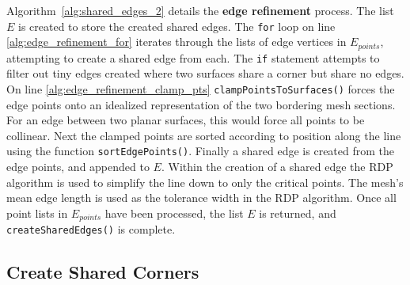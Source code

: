 Algorithm~\ref{alg:shared_edges_2} details the \textbf{edge refinement} process.
The list $E$ is created to store the created shared edges.
The \verb|for| loop on line \ref{alg:edge_refinement_for} iterates through the lists of edge vertices in $E_{points}$, attempting to create a shared edge from each.
The \verb|if| statement attempts to filter out tiny edges created where two surfaces share a corner but share no edges.
On line \ref{alg:edge_refinement_clamp_pts} \verb|clampPointsToSurfaces()| forces the edge points onto an idealized representation of the two bordering mesh sections.
For an edge between two planar surfaces, this would force all points to be collinear.
Next the clamped points are sorted according to position along the line using the function \verb|sortEdgePoints()|.
Finally a shared edge is created from the edge points, and appended to $E$.
Within the creation of a shared edge the RDP algorithm is used to simplify the line down to only the critical points.
The mesh's mean edge length is used as the tolerance width in the RDP algorithm.
Once all point lists in $E_{points}$ have been processed, the list $E$ is returned, and \verb|createSharedEdges()| is complete.

\subsection{Create Shared Corners}


